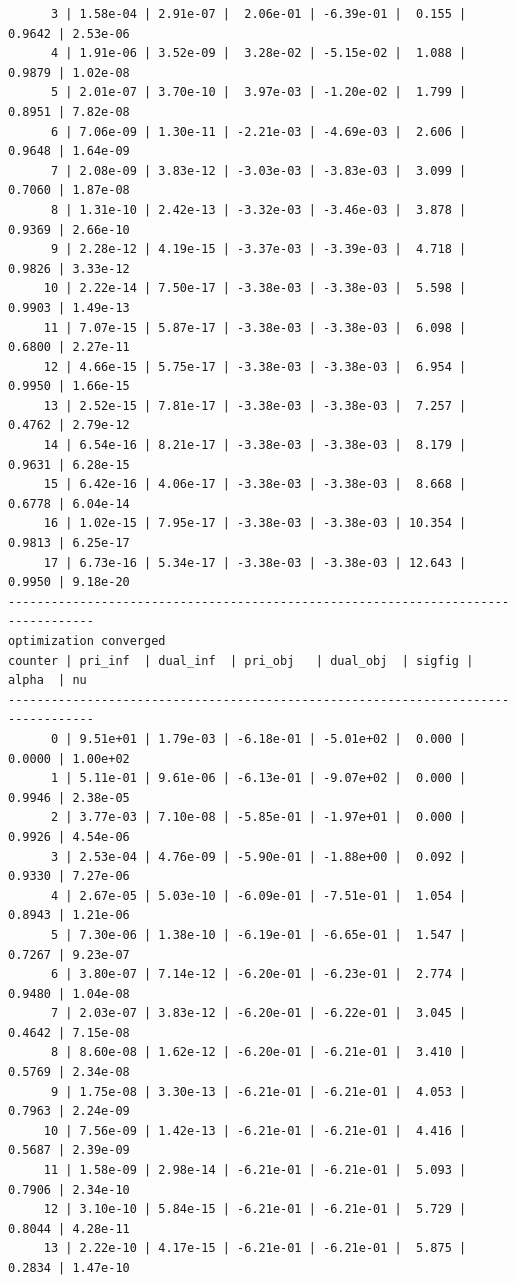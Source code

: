 \documentclass[
]{book}
\begin{document}
\begin{verbatim}
      3 | 1.58e-04 | 2.91e-07 |  2.06e-01 | -6.39e-01 |  0.155 | 0.9642 | 2.53e-06
      4 | 1.91e-06 | 3.52e-09 |  3.28e-02 | -5.15e-02 |  1.088 | 0.9879 | 1.02e-08
      5 | 2.01e-07 | 3.70e-10 |  3.97e-03 | -1.20e-02 |  1.799 | 0.8951 | 7.82e-08
      6 | 7.06e-09 | 1.30e-11 | -2.21e-03 | -4.69e-03 |  2.606 | 0.9648 | 1.64e-09
      7 | 2.08e-09 | 3.83e-12 | -3.03e-03 | -3.83e-03 |  3.099 | 0.7060 | 1.87e-08
      8 | 1.31e-10 | 2.42e-13 | -3.32e-03 | -3.46e-03 |  3.878 | 0.9369 | 2.66e-10
      9 | 2.28e-12 | 4.19e-15 | -3.37e-03 | -3.39e-03 |  4.718 | 0.9826 | 3.33e-12
     10 | 2.22e-14 | 7.50e-17 | -3.38e-03 | -3.38e-03 |  5.598 | 0.9903 | 1.49e-13
     11 | 7.07e-15 | 5.87e-17 | -3.38e-03 | -3.38e-03 |  6.098 | 0.6800 | 2.27e-11
     12 | 4.66e-15 | 5.75e-17 | -3.38e-03 | -3.38e-03 |  6.954 | 0.9950 | 1.66e-15
     13 | 2.52e-15 | 7.81e-17 | -3.38e-03 | -3.38e-03 |  7.257 | 0.4762 | 2.79e-12
     14 | 6.54e-16 | 8.21e-17 | -3.38e-03 | -3.38e-03 |  8.179 | 0.9631 | 6.28e-15
     15 | 6.42e-16 | 4.06e-17 | -3.38e-03 | -3.38e-03 |  8.668 | 0.6778 | 6.04e-14
     16 | 1.02e-15 | 7.95e-17 | -3.38e-03 | -3.38e-03 | 10.354 | 0.9813 | 6.25e-17
     17 | 6.73e-16 | 5.34e-17 | -3.38e-03 | -3.38e-03 | 12.643 | 0.9950 | 9.18e-20
----------------------------------------------------------------------------------
optimization converged
counter | pri_inf  | dual_inf  | pri_obj   | dual_obj  | sigfig | alpha  | nu 
----------------------------------------------------------------------------------
      0 | 9.51e+01 | 1.79e-03 | -6.18e-01 | -5.01e+02 |  0.000 | 0.0000 | 1.00e+02
      1 | 5.11e-01 | 9.61e-06 | -6.13e-01 | -9.07e+02 |  0.000 | 0.9946 | 2.38e-05
      2 | 3.77e-03 | 7.10e-08 | -5.85e-01 | -1.97e+01 |  0.000 | 0.9926 | 4.54e-06
      3 | 2.53e-04 | 4.76e-09 | -5.90e-01 | -1.88e+00 |  0.092 | 0.9330 | 7.27e-06
      4 | 2.67e-05 | 5.03e-10 | -6.09e-01 | -7.51e-01 |  1.054 | 0.8943 | 1.21e-06
      5 | 7.30e-06 | 1.38e-10 | -6.19e-01 | -6.65e-01 |  1.547 | 0.7267 | 9.23e-07
      6 | 3.80e-07 | 7.14e-12 | -6.20e-01 | -6.23e-01 |  2.774 | 0.9480 | 1.04e-08
      7 | 2.03e-07 | 3.83e-12 | -6.20e-01 | -6.22e-01 |  3.045 | 0.4642 | 7.15e-08
      8 | 8.60e-08 | 1.62e-12 | -6.20e-01 | -6.21e-01 |  3.410 | 0.5769 | 2.34e-08
      9 | 1.75e-08 | 3.30e-13 | -6.21e-01 | -6.21e-01 |  4.053 | 0.7963 | 2.24e-09
     10 | 7.56e-09 | 1.42e-13 | -6.21e-01 | -6.21e-01 |  4.416 | 0.5687 | 2.39e-09
     11 | 1.58e-09 | 2.98e-14 | -6.21e-01 | -6.21e-01 |  5.093 | 0.7906 | 2.34e-10
     12 | 3.10e-10 | 5.84e-15 | -6.21e-01 | -6.21e-01 |  5.729 | 0.8044 | 4.28e-11
     13 | 2.22e-10 | 4.17e-15 | -6.21e-01 | -6.21e-01 |  5.875 | 0.2834 | 1.47e-10

\end{verbatim}
\end{document}
